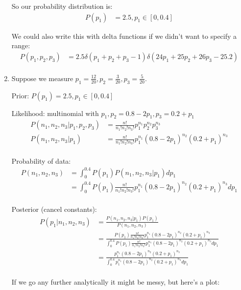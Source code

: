 \begin{enumerate}[label=\textbf{\Alph*}.]
    So our probability distribution is:
    \begin{align*}
        P(p_1) &= 2.5, p_1 \in [0, 0.4]
    \end{align*}

    We could also write this with delta functions if we didn't want to specify a range:
    \begin{align*}
        P(p_1, p_2, p_3) &= 2.5\delta(p_1+p_2+p_3-1)\delta(24p_1 + 25p_2 + 26p_3 - 25.2)\\
    \end{align*}

    \item Suppose we measure $p_1 = \frac{12}{20}, p_2 = \frac{3}{20}, p_3 = \frac{5}{20}$.

    Prior: $P(p_1) = 2.5, p_1 \in [0, 0.4]$

    Likelihood: multinomial with $p_1, p_2 = 0.8 - 2p_1, p_3 = 0.2 + p_1$
    \begin{align*}
        P(n_1, n_2, n_3|p_1, p_2, p_3) &= \frac{n!}{n_1!n_2!n_3!}p_1^{n_1}p_2^{n_2}p_3^{n_3}\\
        P(n_1, n_2, n_3|p_1) &= \frac{n!}{n_1!n_2!n_3!}p_1^{n_1}(0.8 - 2p_1)^{n_2}(0.2 + p_1)^{n_3} \\
    \end{align*}

    Probability of data:
    \begin{align*}
        P(n_1, n_2, n_3) &= \int_0^{0.4} P(p_1)P(n_1, n_2, n_3 | p_1)dp_1 \\
        &= \int_0^{0.4} P(p_1)\frac{n!}{n_1!n_2!n_3!}p_1^{n_1}(0.8 - 2p_1)^{n_2}(0.2 + p_1)^{n_3}dp_1 \\
    \end{align*}

    Posterior (cancel constants):
    \begin{align*}
        P(p_1| n_1, n_2, n_3) &= \frac{P(n_1, n_2, n_3| p_1)P(p_1)}{P(n_1, n_2, n_3)}\\
        &= \frac{P(p_1)\frac{n!}{n_1!n_2!n_3!}p_1^{n_1}(0.8 - 2p_1)^{n_2}(0.2 + p_1)^{n_3}}{\int_0^{0.4} P(p_1)\frac{n!}{n_1!n_2!n_3!}p_1^{n_1}(0.8 - 2p_1)^{n_2}(0.2 + p_1)^{n_3}dp_1}\\
        &= \frac{p_1^{n_1}(0.8 - 2p_1)^{n_2}(0.2 + p_1)^{n_3}}{\int_0^{0.4} p_1^{n_1}(0.8 - 2p_1)^{n_2}(0.2 + p_1)^{n_3}dp_1}\\
    \end{align*}

    \newpage
    If we go any further analytically it might be messy, but here's a plot:


\end{enumerate}

